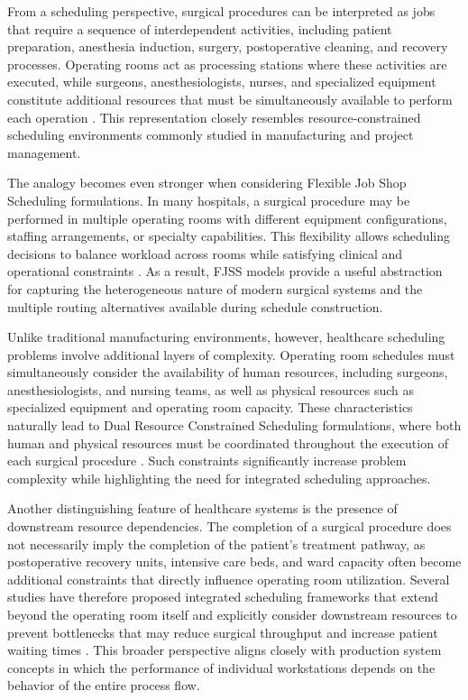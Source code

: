 \documentclass[sn-mathphys-num]{sn-jnl}
\begin{document}
    From a scheduling perspective, surgical procedures can be interpreted as jobs that require a sequence of interdependent activities, including patient preparation, anesthesia induction, surgery, postoperative cleaning, and recovery processes. Operating rooms act as processing stations where these activities are executed, while surgeons, anesthesiologists, nurses, and specialized equipment constitute additional resources that must be simultaneously available to perform each operation \cite{barbagallo2015,chamarthi2025}. This representation closely resembles resource-constrained scheduling environments commonly studied in manufacturing and project management.
    
    The analogy becomes even stronger when considering Flexible Job Shop Scheduling formulations. In many hospitals, a surgical procedure may be performed in multiple operating rooms with different equipment configurations, staffing arrangements, or specialty capabilities. This flexibility allows scheduling decisions to balance workload across rooms while satisfying clinical and operational constraints \cite{vieira2025}. As a result, FJSS models provide a useful abstraction for capturing the heterogeneous nature of modern surgical systems and the multiple routing alternatives available during schedule construction.
    
    Unlike traditional manufacturing environments, however, healthcare scheduling problems involve additional layers of complexity. Operating room schedules must simultaneously consider the availability of human resources, including surgeons, anesthesiologists, and nursing teams, as well as physical resources such as specialized equipment and operating room capacity. These characteristics naturally lead to Dual Resource Constrained Scheduling formulations, where both human and physical resources must be coordinated throughout the execution of each surgical procedure \cite{roshanaei2017,tsang2025}. Such constraints significantly increase problem complexity while highlighting the need for integrated scheduling approaches.
    
    Another distinguishing feature of healthcare systems is the presence of downstream resource dependencies. The completion of a surgical procedure does not necessarily imply the completion of the patient's treatment pathway, as postoperative recovery units, intensive care beds, and ward capacity often become additional constraints that directly influence operating room utilization. Several studies have therefore proposed integrated scheduling frameworks that extend beyond the operating room itself and explicitly consider downstream resources to prevent bottlenecks that may reduce surgical throughput and increase patient waiting times \cite{fallahpour2024,fairley2019}. This broader perspective aligns closely with production system concepts in which the performance of individual workstations depends on the behavior of the entire process flow.
    
\end{document}
